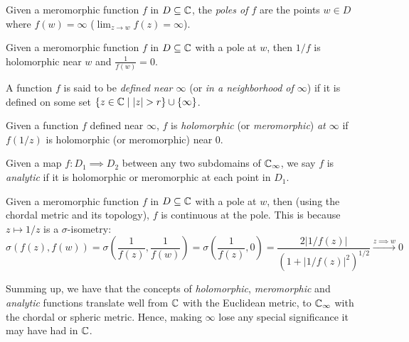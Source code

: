 \begin{definition}[Pole of $f$]
    Given a meromorphic function $f$ in $D \subseteq \mathbb{C}$, the \emph{poles of
    $f$} are the points $w \in D$ where $f(w) = \infty$ ($\lim_{z \to w} f(z) =
    \infty$).
\end{definition}

\begin{remark}
    Given a meromorphic function $f$ in $D \subseteq \mathbb{C}$ with a pole at $w$,
    then $1/f$ is holomorphic near $w$ and $\frac{1}{f(w)} = 0$.
\end{remark}

\begin{definition}
    A function $f$ is said to be \emph{defined near $\infty$} (or \emph{in a
    neighborhood of $\infty$}) if it is defined on some set $\{ z \in \mathbb{C} \mid
    |z| > r \} \cup \{\infty\}$.
\end{definition}

\begin{definition}
    Given a function $f$ defined near $\infty$, $f$ is \emph{holomorphic} (or
    \emph{meromorphic}) \emph{at $\infty$} if $f(1/z)$ is holomorphic (or
    meromorphic) near $0$.
\end{definition}

\begin{definition}
    Given a map $f : D_1 \implies D_2$ between any two subdomains of $\mathbb{C}_\infty$,
    we say $f$ is \emph{analytic} if it is holomorphic or meromorphic at each
    point in $D_1$.
\end{definition}

\begin{remark}
    Given a meromorphic function $f$ in $D \subseteq \mathbb{C}$ with a pole at $w$,
    then (using the chordal metric and its topology), $f$ is continuous at the
    pole. This is because $z \mapsto 1/z$ is a $\sigma$-isometry:
    \begin{equation*}
        \sigma(f(z), f(w)) = \sigma\left(\frac{1}{f(z)}, \frac{1}{f(w)}\right) = \sigma\left(\frac{1}{f(z)}, 0\right) = \frac{2|1/f(z)|}{(1+|1/f(z)|^2)^{1/2}} \xrightarrow{z \implies w} 0
    \end{equation*}
\end{remark}

Summing up, we have that the concepts of \emph{holomorphic}, \emph{meromorphic}
and \emph{analytic} functions translate well from $\mathbb{C}$ with the Euclidean
metric, to $\mathbb{C}_\infty$ with the chordal or spheric metric. Hence, making $\infty$
lose any special significance it may have had in $\mathbb{C}$.

